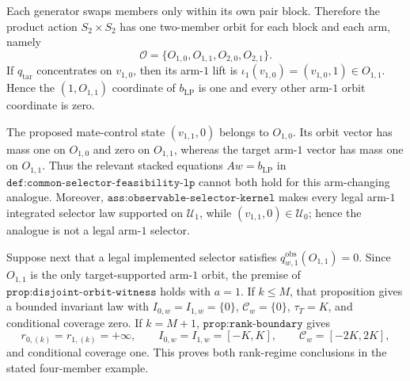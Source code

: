 Each generator swaps members only within its own pair block. Therefore the product action \(S_2\times S_2\) has one two-member orbit for each block and each arm, namely
\[
\mathcal O=\{O_{1,0},O_{1,1},O_{2,0},O_{2,1}\}.
\]
If \(q_{\mathrm{tar}}\) concentrates on \(v_{1,0}\), then its arm-\(1\) lift is \(\iota_1(v_{1,0})=(v_{1,0},1)\in O_{1,1}\). Hence the \((1,O_{1,1})\) coordinate of \(b_{\mathrm{LP}}\) is one and every other arm-\(1\) orbit coordinate is zero.

The proposed mate-control state \((v_{1,1},0)\) belongs to \(O_{1,0}\). Its orbit vector has mass one on \(O_{1,0}\) and zero on \(O_{1,1}\), whereas the target arm-\(1\) vector has mass one on \(O_{1,1}\). Thus the relevant stacked equations \(Aw=b_{\mathrm{LP}}\) in \(\texttt{def:common-selector-feasibility-lp}\) cannot both hold for this arm-changing analogue. Moreover, \(\texttt{ass:observable-selector-kernel}\) makes every legal arm-\(1\) integrated selector law supported on \(\mathcal U_1\), while \((v_{1,1},0)\in\mathcal U_0\); hence the analogue is not a legal arm-\(1\) selector.

Suppose next that a legal implemented selector satisfies \(q^{\mathrm{obs}}_{w,1}(O_{1,1})=0\). Since \(O_{1,1}\) is the only target-supported arm-\(1\) orbit, the premise of \(\texttt{prop:disjoint-orbit-witness}\) holds with \(a=1\). If \(k\le M\), that proposition gives a bounded invariant law with \(I_{0,w}=I_{1,w}=\{0\}\), \(\mathcal C_w=\{0\}\), \(\tau_T=K\), and conditional coverage zero. If \(k=M+1\), \(\texttt{prop:rank-boundary}\) gives
\[
r_{0,(k)}=r_{1,(k)}=+\infty,\qquad I_{0,w}=I_{1,w}=[-K,K],\qquad \mathcal C_w=[-2K,2K],
\]
and conditional coverage one. This proves both rank-regime conclusions in the stated four-member example.